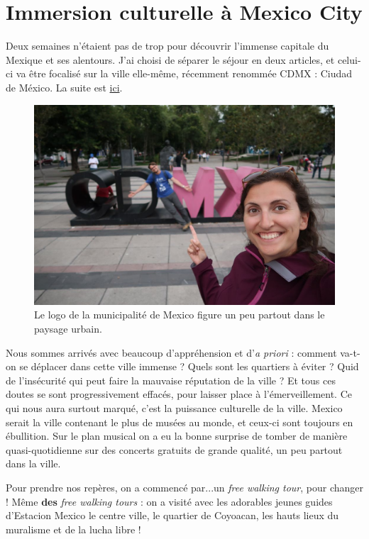 \hypertarget{immersion-culturelle-uxe0-mexico-city}{%
\section{Immersion culturelle à Mexico
City}\label{immersion-culturelle-uxe0-mexico-city}}

Deux semaines n'étaient pas de trop pour découvrir l'immense capitale du
Mexique et ses alentours. J'ai choisi de séparer le séjour en deux
articles, et celui-ci va être focalisé sur la ville elle-même, récemment
renommée CDMX : Ciudad de México. La suite est
\href{/excursions-mexico.html}{ici}.

\begin{figure}
\centering
\includegraphics{images/20180930_cdmx.JPG}
\caption{Le logo de la municipalité de Mexico figure un peu partout dans
le paysage urbain.}
\end{figure}

Nous sommes arrivés avec beaucoup d'appréhension et d'\emph{a priori} :
comment va-t-on se déplacer dans cette ville immense ? Quels sont les
quartiers à éviter ? Quid de l'insécurité qui peut faire la mauvaise
réputation de la ville ? Et tous ces doutes se sont progressivement
effacés, pour laisser place à l'émerveillement. Ce qui nous aura surtout
marqué, c'est la puissance culturelle de la ville. Mexico serait la
ville contenant le plus de musées au monde, et ceux-ci sont toujours en
ébullition. Sur le plan musical on a eu la bonne surprise de tomber de
manière quasi-quotidienne sur des concerts gratuits de grande qualité,
un peu partout dans la ville.

Pour prendre nos repères, on a commencé par...un \emph{free walking
tour}, pour changer ! Même \textbf{des} \emph{free walking tours} : on a
visité avec les adorables jeunes guides d'Estacion Mexico le centre
ville, le quartier de Coyoacan, les hauts lieux du muralisme et de la
lucha libre !

